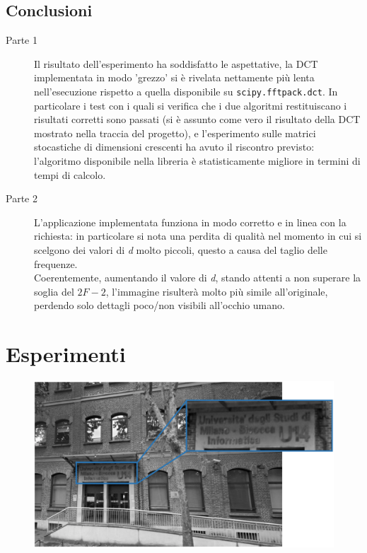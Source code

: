 \documentclass[preprint,12pt]{elsarticle}
\begin{document}
\newpage

\subsection*{Conclusioni}

\begin{description}
	\item[Parte 1] Il risultato dell'esperimento ha soddisfatto le aspettative, la DCT implementata in modo 'grezzo' si è rivelata nettamente più lenta nell'esecuzione rispetto a quella disponibile su \texttt{scipy.fftpack.dct}.
	In particolare i test con i quali si verifica che i due algoritmi restituiscano i risultati corretti sono passati (si è assunto come vero il risultato della DCT mostrato nella traccia del progetto), e l'esperimento sulle matrici stocastiche di dimensioni crescenti ha avuto il riscontro previsto: l'algoritmo disponibile nella libreria è statisticamente migliore in termini di tempi di calcolo.
	
	\item[Parte 2] L'applicazione implementata funziona in modo corretto e in linea con la richiesta: in particolare si nota una perdita di qualità nel momento in cui si scelgono dei valori di \textit{d} molto piccoli, questo a causa del taglio delle frequenze.\\
	Coerentemente, aumentando il valore di \textit{d}, stando attenti a non superare la soglia del $2F-2$, l'immagine risulterà molto più simile all'originale, perdendo solo dettagli poco/non visibili all'occhio umano.
\end{description}

\newpage
\appendix

\section{Esperimenti}

\begin{figure}[H]
	\includegraphics[width=\linewidth]{f1}
	\centering
\end{figure}
\end{document}
